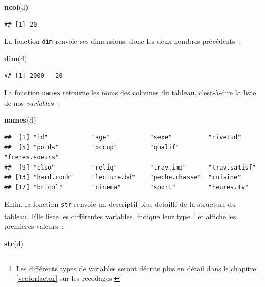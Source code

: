 \documentclass[12pt,]{book}
\newenvironment{Shaded}{\begin{snugshade}}{\end{snugshade}}
\newcommand{\KeywordTok}[1]{\textcolor[rgb]{0.27,0.27,0.27}{\textbf{#1}}}
\newcommand{\NormalTok}[1]{#1}
\begin{document}
\begin{Shaded}
\begin{Highlighting}[]
\KeywordTok{ncol}\NormalTok{(d)}
\end{Highlighting}
\end{Shaded}

\begin{verbatim}
## [1] 20
\end{verbatim}

La fonction \texttt{dim} renvoie ses dimensions, donc les deux nombres précédents~:

\begin{Shaded}
\begin{Highlighting}[]
\KeywordTok{dim}\NormalTok{(d)}
\end{Highlighting}
\end{Shaded}

\begin{verbatim}
## [1] 2000   20
\end{verbatim}

La fonction \texttt{names} retourne les noms des colonnes du tableau, c'est-à-dire la liste de nos \emph{variables}~:

\begin{Shaded}
\begin{Highlighting}[]
\KeywordTok{names}\NormalTok{(d)}
\end{Highlighting}
\end{Shaded}

\begin{verbatim}
##  [1] "id"            "age"           "sexe"          "nivetud"      
##  [5] "poids"         "occup"         "qualif"        "freres.soeurs"
##  [9] "clso"          "relig"         "trav.imp"      "trav.satisf"  
## [13] "hard.rock"     "lecture.bd"    "peche.chasse"  "cuisine"      
## [17] "bricol"        "cinema"        "sport"         "heures.tv"
\end{verbatim}

Enfin, la fonction \texttt{str} renvoie un descriptif plus détaillé de la structure du tableau. Elle liste les différentes variables, indique leur type \footnote{Les différents types de variables seront décrits plus en détail dans le chapitre \ref{vectorfactor} sur les recodages.} et affiche les premières valeurs~:

\begin{Shaded}
\begin{Highlighting}[]
\KeywordTok{str}\NormalTok{(d)}
\end{Highlighting}
\end{Shaded}
\end{document}
